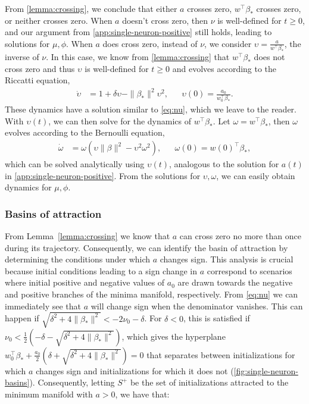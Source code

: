 \documentclass{article}
\theoremstyle{plain}
\theoremstyle{definition}
\theoremstyle{remark}
\begin{document}
From \cref{lemma:crossing}, we conclude that either $a$ crosses zero, $w^\intercal \beta_*$ crosses zero, or neither crosses zero.
%
When $a$ doesn't cross zero, then $\nu$ is well-defined for $t\geq 0$, and our argument from \cref{app:single-neuron-positive} still holds, leading to solutions for $\mu, \phi$.
%
When $a$ does cross zero, instead of $\nu$, we consider $\upsilon = \tfrac{a}{w^\intercal \beta_*}$, the inverse of $\nu$.
%
In this case, we know from \cref{lemma:crossing} that $w^\intercal \beta_*$ does not cross zero and thus $\upsilon$ is well-defined for $t \ge 0$ and evolves according to the Riccatti equation,
\begin{align}
    \dot{\upsilon} 
    &=  1 + \delta\upsilon - \|\beta_*\|^2\upsilon^2, &&\upsilon(0)=\tfrac{a_0}{w_0^\intercal \beta_*}.
\end{align}
These dynamics have a solution similar to \cref{eq:nu}, which we leave to the reader.
%
With $\upsilon(t)$, we can then solve for the dynamics of $w^\intercal \beta_*$.
%
Let $\omega = w^\intercal \beta_*$, then $\omega$ evolves according to the Bernoulli equation,
\begin{align}
    \dot{\omega} &= \omega \left( \upsilon\|\beta\|^2 - \upsilon^{2}\omega^2 \right), &&\omega(0) = w(0)^\intercal \beta_*,
\end{align}
which can be solved analytically using $\upsilon(t)$, analogous to the solution for $a(t)$ in \cref{app:single-neuron-positive}.
%
From the solutions for $\upsilon, \omega$, we can easily obtain dynamics for $\mu, \phi$.



\subsubsection{Basins of attraction}
\label{app:single-neuron-basins}
%
From Lemma~\ref{lemma:crossing} we know that $a$ can cross zero no more than once during its trajectory. 
%
Consequently, we can identify the basin of attraction by determining the conditions under which $a$ changes sign.
%
This analysis is crucial because initial conditions leading to a sign change in $a$ correspond to scenarios where initial positive and negative values of $a_0$ are drawn towards the negative and positive branches of the minima manifold, respectively.
%
From \cref{eq:nu} we can immediately see that $a$ will change sign when the denominator vanishes. 
%
This can happen if  $\sqrt{\delta^2 + 4\|\beta_*\|^2} < - 2\nu_0 - \delta$. 
%
For $\delta < 0$, this is satisfied if $\nu_0 < \frac{1}{2} \left(-\delta - \sqrt{\delta^2 + 4\|\beta_*\|^2}\right)$, which gives the hyperplane $w_0^\intercal \beta_* + \frac{a_0}{2}\left(\delta + \sqrt{\delta^2 + 4\|\beta_*\|^2} \right) = 0$ that separates between initializations for which $a$ changes sign and initializations for which it does not (\cref{fig:single-neuron-basins}).
%
Consequently, letting $S^+$ be the set of initializations attracted to the minimum manifold with $a > 0$, we have that:
\end{document}
